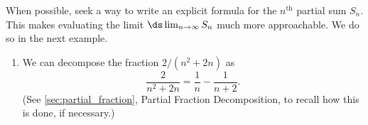 When possible, seek a way to write an explicit formula for the $n^\text{th}$ partial sum $S_n$. This makes evaluating the limit $\ds\lim_{n\to\infty} S_n$ much more approachable. We do so in the next example.



{\begin{enumerate}
\item		We can decompose the fraction $2/(n^2+2n)$ as
\[\frac2{n^2+2n} = \frac1n-\frac1{n+2}.\]
(See \autoref{sec:partial_fraction}, Partial Fraction Decomposition, to recall how  this is done, if necessary.)


\end{enumerate}}
